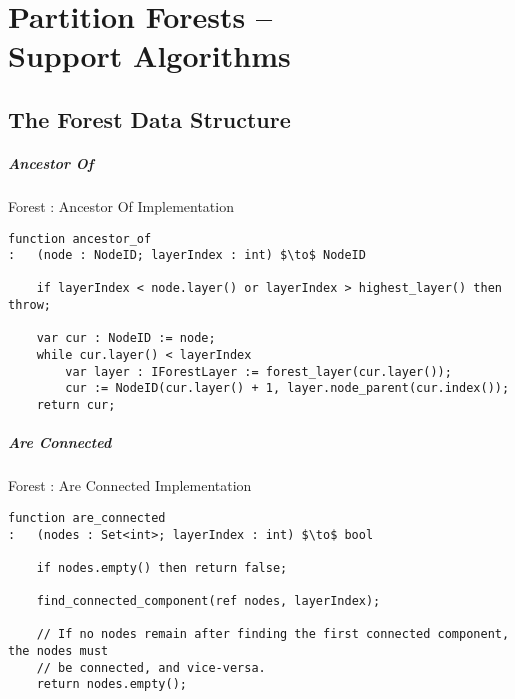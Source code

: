 \chapter[Partition Forests -- Support Algorithms]{Partition Forests --\\Support Algorithms}
\label{chap:appendixpf}


\section{The Forest Data Structure}

\paragraph{Ancestor Of}

\begin{stulisting}[H]
\caption{Forest : Ancestor Of Implementation}
\begin{lstlisting}[style=Default]
function ancestor_of
:	(node : NodeID; layerIndex : int) $\to$ NodeID

	if layerIndex < node.layer() or layerIndex > highest_layer() then throw;

	var cur : NodeID := node;
	while cur.layer() < layerIndex
		var layer : IForestLayer := forest_layer(cur.layer());
		cur := NodeID(cur.layer() + 1, layer.node_parent(cur.index());
	return cur;
\end{lstlisting}
\end{stulisting}

\paragraph{Are Connected}

\begin{stulisting}[H]
\caption{Forest : Are Connected Implementation}
\begin{lstlisting}[style=Default]
function are_connected
:	(nodes : Set<int>; layerIndex : int) $\to$ bool

	if nodes.empty() then return false;

	find_connected_component(ref nodes, layerIndex);

	// If no nodes remain after finding the first connected component, the nodes must
	// be connected, and vice-versa.
	return nodes.empty();
\end{lstlisting}
\end{stulisting}

